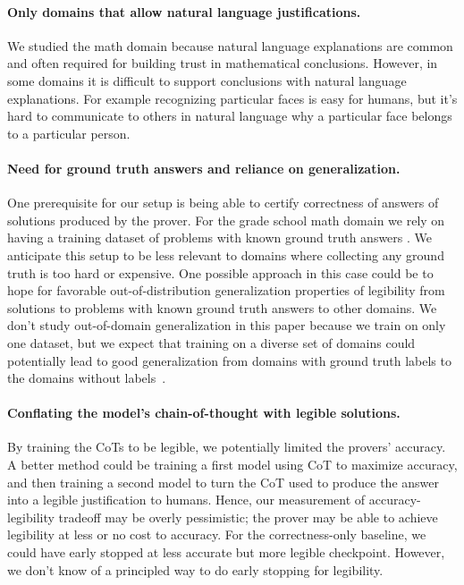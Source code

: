 \documentclass{article}
\begin{document}
\paragraph{Only domains that allow natural language justifications.} We studied the math domain because natural language explanations are common and often required for building trust in mathematical conclusions. However, in some domains it is difficult to support conclusions with natural language explanations. For example recognizing particular faces is easy for humans, but it's hard to communicate to others in natural language why a particular face belongs to a particular person.


\paragraph{Need for ground truth answers and reliance on generalization.} One prerequisite for our setup is being able to certify correctness of answers of solutions produced by the prover. For the grade school math domain we rely on having a training dataset of problems with known ground truth answers \citep{cobbe2021training}. We anticipate this setup to be less relevant to domains where collecting any ground truth is too hard or expensive. One possible approach in this case could be to hope for favorable out-of-distribution generalization properties of legibility from solutions to problems with known ground truth answers to other domains. We don't study out-of-domain generalization in this paper because we train on only one dataset, but we expect that training on a diverse set of domains could potentially lead to good generalization from domains with ground truth labels to the domains without labels~\citep{burns2023weak}.


\paragraph{Conflating the model's chain-of-thought with legible solutions.}
By training the CoTs to be legible, we potentially limited the provers' accuracy. A better method could be training a first model using CoT to maximize accuracy, and then training a second model to turn the CoT used to produce the answer into a legible justification to humans. Hence, our measurement of accuracy-legibility tradeoff may be overly pessimistic; the prover may be able to achieve legibility at less or no cost to accuracy. For the correctness-only baseline, we could have early stopped at less accurate but more legible checkpoint. However, we don't know of a principled way to do early stopping for legibility.
\end{document}
